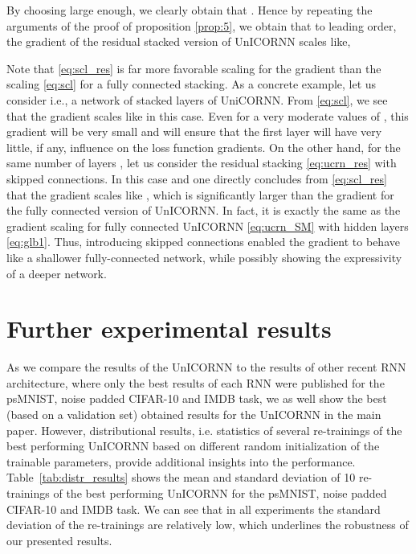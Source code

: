 \documentclass[a4paper]{article}
\newcommand{\Tref}[1]{Table~\ref{#1}}
\begin{document}
    
By choosing  large enough, we clearly obtain that . Hence by repeating the arguments of the proof of proposition \ref{prop:5}, we obtain that to leading order, the gradient of the residual stacked version of UnICORNN scales like,

Note that \eqref{eq:scl_res} is far more favorable scaling for the gradient than the scaling \eqref{eq:scl} for a fully connected stacking. As a concrete example, let us consider  i.e., a network of  stacked layers of UniCORNN. From \eqref{eq:scl}, we see that the gradient scales like  in this case. Even for a very moderate values of , this gradient will be very small and will ensure that the first layer will have very little, if any, influence on the loss function gradients. On the other hand, for the same number of layers , let us consider the residual stacking \eqref{eq:ucrn_res} with  skipped connections. In this case  and one directly concludes from \eqref{eq:scl_res} that the gradient scales like , which is significantly larger than the gradient for the fully connected version of UnICORNN. In fact, it is exactly the same as the gradient scaling for fully connected UnICORNN \eqref{eq:ucrn_SM} with  hidden layers \eqref{eq:glb1}. Thus, introducing skipped connections enabled the gradient to behave like a shallower fully-connected network, while possibly showing the expressivity of a deeper network.  


\section{Further experimental results}
As we compare the results of the UnICORNN to the results of other recent RNN architecture, where only the best results of each RNN were published for the psMNIST, noise padded CIFAR-10 and IMDB task, we as well show the best (based on a validation set) obtained results for the UnICORNN in the main paper. However, distributional results, i.e. statistics of several re-trainings of the best performing UnICORNN based on different random initialization of the trainable parameters, provide additional insights into the performance. \Tref{tab:distr_results} shows the mean and standard deviation of 10 re-trainings of the best performing UnICORNN for the psMNIST, noise padded CIFAR-10 and IMDB task. We can see that in all experiments the standard deviation of the re-trainings are relatively low, which underlines the robustness of our presented results. 
\end{document}

